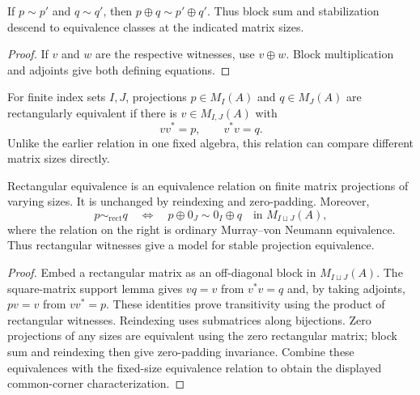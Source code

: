 \begin{proposition}\label{prop:projection-block-sum}
If $p\sim p'$ and $q\sim q'$, then $p\oplus q\sim p'\oplus q'$.
Thus block sum and stabilization descend to equivalence classes at the
indicated matrix sizes.
\end{proposition}
\begin{proof}
\leanok
If $v$ and $w$ are the respective witnesses, use $v\oplus w$.
Block multiplication and adjoints give both defining equations.
\end{proof}

\begin{definition}\label{def:rectangular-projection-equivalence}
\leanok
For finite index sets $I,J$, projections $p\in M_I(A)$ and $q\in M_J(A)$
are rectangularly equivalent if there is $v\in M_{I,J}(A)$ with
\[
 vv^*=p,\qquad v^*v=q.
\]
Unlike the earlier relation in one fixed algebra, this relation can compare
different matrix sizes directly.
\end{definition}

\begin{proposition}\label{prop:rectangular-equivalence-stable}
Rectangular equivalence is an equivalence relation on finite matrix projections
of varying sizes. It is unchanged by reindexing and zero-padding. Moreover,
\[
 p\sim_{\mathrm{rect}}q
 \quad\Longleftrightarrow\quad
 p\oplus0_J\sim 0_I\oplus q\quad\text{in }M_{I\sqcup J}(A),
\]
where the relation on the right is ordinary Murray--von Neumann equivalence.
Thus rectangular witnesses give a model for stable projection equivalence.
\end{proposition}
\begin{proof}
\leanok
Embed a rectangular matrix as an off-diagonal block in $M_{I\sqcup J}(A)$.
The square-matrix support lemma gives $vq=v$ from $v^*v=q$ and, by taking
adjoints, $pv=v$ from $vv^*=p$. These identities prove transitivity using
the product of rectangular witnesses. Reindexing uses submatrices along
bijections. Zero projections of any sizes are equivalent using the zero
rectangular matrix; block sum and reindexing then give zero-padding invariance.
Combine these equivalences with the fixed-size equivalence relation to obtain
the displayed common-corner characterization.
\end{proof}

